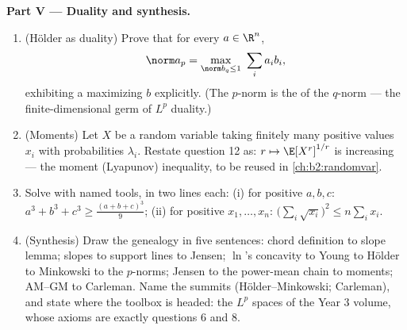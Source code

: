 \begin{problem}
\medskip
\noindent\textbf{Part V --- Duality and synthesis.}
\begin{enumerate}[resume]
  \item (H\"older as duality) Prove that for every $a \in
        \R^n$,
        \[
        \norm a_p = \max_{\norm b_q \leq 1}\ \sum_i a_ib_i ,
        \]
        exhibiting a maximizing $b$ explicitly. (The $p$-norm
        is the  of the $q$-norm --- the finite-dimensional
        germ of $L^p$ duality.)
  \item (Moments) Let $X$ be a random variable taking finitely
        many positive values $x_i$ with probabilities
        $\lambda_i$. Restate question 12 as: $r \mapsto
        \E[X^r]^{1/r}$ is increasing --- the moment
        (Lyapunov) inequality, to be reused in
        \cref{ch:b2:randomvar}.
  \item Solve with named tools, in two lines each: (i) for
        positive $a, b, c$: $a^3 + b^3 + c^3 \geq
        \frac{(a+b+c)^3}{9}$; (ii) for positive $x_1, \dots,
        x_n$: $\bigl(\sum_i\sqrt{x_i}\bigr)^2 \leq
        n\sum_i x_i$.
  \item (Synthesis) Draw the genealogy in five sentences: chord
        definition to slope lemma; slopes to support lines to
        Jensen; $\ln$'s concavity to Young to H\"older to
        Minkowski to the $p$-norms; Jensen to the power-mean
        chain to moments; AM--GM to Carleman. Name the summits
        (H\"older--Minkowski; Carleman), and state where the
        toolbox is headed: the $L^p$ spaces of the Year 3
        volume, whose axioms are exactly questions 6 and 8.
\end{enumerate}
\end{problem}
